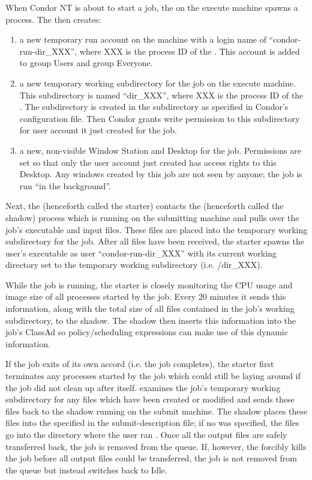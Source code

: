 When Condor NT is about to start a job, the  on the execute
machine spawns a  process.  The  then
creates:
\begin{enumerate}

\item a new temporary run account on the machine with a login name of
``condor-run-dir\_XXX'', where XXX is the process ID of the
.  This account is added to group Users and group Everyone.

\item a new temporary working subdirectory for the job on the execute machine.  This subdirectory is
named ``dir\_XXX'', where XXX is the process ID of the .
The subdirectory is created in the  subdirectory as
specified in Condor's configuration file.  Then Condor grants write
permission to this subdirectory for user account it just created for the
job.

\item a new, non-visible Window Station and Desktop for the job.
Permissions are set so that only the
user account just created has access rights to this Desktop.  Any windows
created by this job are not seen by anyone; the job is run ``in the
background''.

\end{enumerate}

Next, the  (henceforth called the starter) contacts the  (henceforth called the shadow) process which is
running on the submitting machine and pulls over the job's executable and
input files.  These files are placed into the temporary working subdirectory for the
job.  After all files have been received, the starter spawns the
user's executable as user ``condor-run-dir\_XXX'' with its current working
directory set to the temporary working subdirectory (i.e. /dir\_XXX).

While the job is running, the starter is closely monitoring the CPU
usage and image size of all processes started by the job.  Every 20 minutes it sends this
information, along with the total size of all files contained in the job's
working subdirectory, to the shadow.  The shadow then
inserts this information into the job's ClassAd so policy/scheduling
expressions can make use of this dynamic information.

If the job exits of its own accord (i.e. the job completes), the starter
first terminates any processes started by the job which could still be
laying around if the job did not clean up after itself.
examines the job's temporary working subdirectory for any files which have been
created or modified and sends these files back to the shadow running on the
submit machine.  The shadow
places these files into the  specified in the
submit-description file; if no  was specified, the files go
into the directory where the user ran .  Once all the output
files are safely transferred back, the job is removed from the queue.  If,
however, the  forcibly kills the job before all output files
could be transferred, the job is not removed from the queue but instead
switches back to Idle.  

